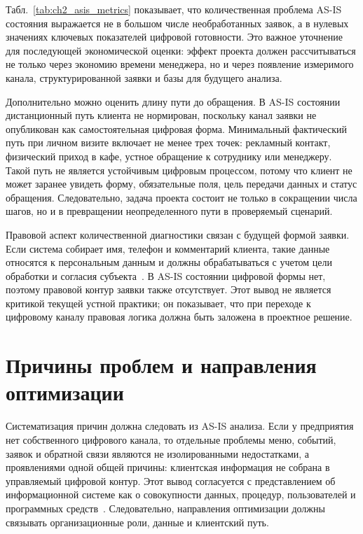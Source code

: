 Табл.~\ref{tab:ch2_asis_metrics} показывает, что количественная проблема AS-IS состояния выражается не в большом числе необработанных заявок, а в нулевых значениях ключевых показателей цифровой готовности. Это важное уточнение для последующей экономической оценки: эффект проекта должен рассчитываться не только через экономию времени менеджера, но и через появление измеримого канала, структурированной заявки и базы для будущего анализа.

Дополнительно можно оценить длину пути до обращения. В AS-IS состоянии дистанционный путь клиента не нормирован, поскольку канал заявки не опубликован как самостоятельная цифровая форма. Минимальный фактический путь при личном визите включает не менее трех точек: рекламный контакт, физический приход в кафе, устное обращение к сотруднику или менеджеру. Такой путь не является устойчивым цифровым процессом, потому что клиент не может заранее увидеть форму, обязательные поля, цель передачи данных и статус обращения. Следовательно, задача проекта состоит не только в сокращении числа шагов, но и в превращении неопределенного пути в проверяемый сценарий.

Правовой аспект количественной диагностики связан с будущей формой заявки. Если система собирает имя, телефон и комментарий клиента, такие данные относятся к персональным данным и должны обрабатываться с учетом цели обработки и согласия субъекта~\cite{fz152,moric2024}. В AS-IS состоянии цифровой формы нет, поэтому правовой контур заявки также отсутствует. Этот вывод не является критикой текущей устной практики; он показывает, что при переходе к цифровому каналу правовая логика должна быть заложена в проектное решение.

\section{Причины проблем и направления оптимизации}

Систематизация причин должна следовать из AS-IS анализа. Если у предприятия нет собственного цифрового канала, то отдельные проблемы меню, событий, заявок и обратной связи являются не изолированными недостатками, а проявлениями одной общей причины: клиентская информация не собрана в управляемый цифровой контур. Этот вывод согласуется с представлением об информационной системе как о совокупности данных, процедур, пользователей и программных средств~\cite{gost34003,utkin_baldin_2003}. Следовательно, направления оптимизации должны связывать организационные роли, данные и клиентский путь.

